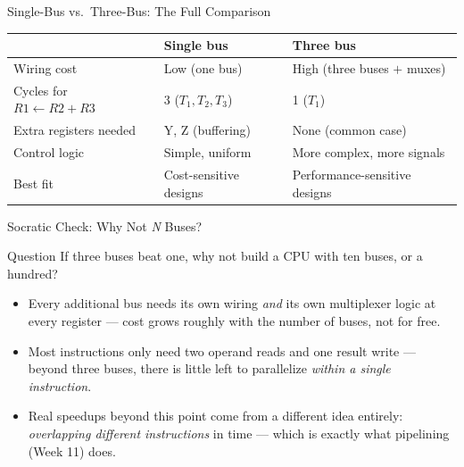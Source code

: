 \documentclass[aspectratio=169]{beamer}
\begin{document}
\begin{frame}{Single-Bus vs.\ Three-Bus: The Full Comparison}
  \footnotesize
  \begin{tabular}{@{}p{3.2cm}p{4.4cm}p{4.4cm}@{}}
    \toprule
     & \textbf{Single bus} & \textbf{Three bus} \\
    \midrule
    Wiring cost        & Low (one bus)                & High (three buses $+$ muxes) \\
    Cycles for $R1 \gets R2{+}R3$ & 3 ($T_1, T_2, T_3$)   & 1 ($T_1$) \\
    Extra registers needed & Y, Z (buffering)         & None (common case) \\
    Control logic       & Simple, uniform              & More complex, more signals \\
    Best fit             & Cost-sensitive designs        & Performance-sensitive designs \\
    \bottomrule
  \end{tabular}
  \vspace{0.3cm}
  \begin{center}
  \end{center}
\end{frame}

\begin{frame}{Socratic Check: Why Not \emph{N} Buses?}
  \begin{alertblock}{Question}
    If three buses beat one, why not build a CPU with ten buses, or a hundred?
  \end{alertblock}
  \begin{itemize}
    \item Every additional bus needs its own wiring \emph{and} its own multiplexer
      logic at every register --- cost grows roughly with the number of buses,
      not for free.
    \item Most instructions only need two operand reads and one result write ---
      beyond three buses, there is little left to parallelize \emph{within a single
      instruction}.
    \item Real speedups beyond this point come from a different idea entirely:
      \emph{overlapping different instructions} in time --- which is exactly what
      pipelining (Week 11) does.
  \end{itemize}
\end{frame}

\end{document}
